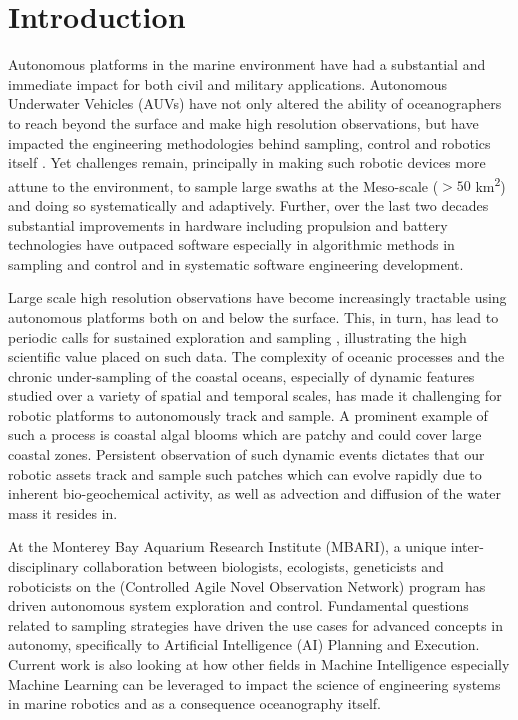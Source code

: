 \section{Introduction}
\label{sec:intro}


Autonomous platforms in the marine environment have had a substantial
and immediate impact for both civil and military
applications. Autonomous Underwater Vehicles (AUVs) have not only
altered the ability of oceanographers to reach beyond the surface and
make high resolution observations, but have impacted the engineering
methodologies behind sampling, control and robotics itself
\cite{Brierley08032002,ryan05,Thomas06,Yoerger01012007,Incze2009,Rigby10}. Yet
challenges remain, principally in making such robotic devices more
attune to the environment, to sample large swaths at the Meso-scale
($> 50$ km\textsuperscript{2}) and doing so systematically and
adaptively. Further, over the last two decades substantial
improvements in hardware including propulsion and battery technologies
have outpaced software especially in algorithmic methods in sampling
and control and in systematic software engineering development.

Large scale high resolution observations have become increasingly
tractable using autonomous platforms both on and below the surface.
This, in turn, has lead to periodic calls for sustained exploration
and sampling \cite{rudnick03}, illustrating the high scientific value
placed on such data.  The complexity of oceanic processes and the
chronic under-sampling of the coastal oceans, especially of dynamic
features studied over a variety of spatial and temporal scales, has
made it challenging for robotic platforms to autonomously track and
sample. A prominent example of such a process is coastal algal blooms
which are patchy and could cover large coastal zones. Persistent
observation of such dynamic events dictates that our robotic assets
track and sample such patches which can evolve rapidly due to inherent
bio-geochemical activity, as well as advection and diffusion of the
water mass it resides in.

At the Monterey Bay Aquarium Research Institute (MBARI), a unique
inter-disciplinary collaboration between biologists, ecologists,
geneticists and roboticists on the \can (Controlled Agile Novel
Observation Network) program \cite{canon} has driven autonomous system
exploration and control. Fundamental questions related to sampling
strategies have driven the use cases for advanced concepts in
autonomy, specifically to Artificial Intelligence (AI) Planning and
Execution. Current work is also looking at how other fields in Machine
Intelligence especially Machine Learning can be leveraged to impact
the science of engineering systems in marine robotics and as a
consequence oceanography itself.

